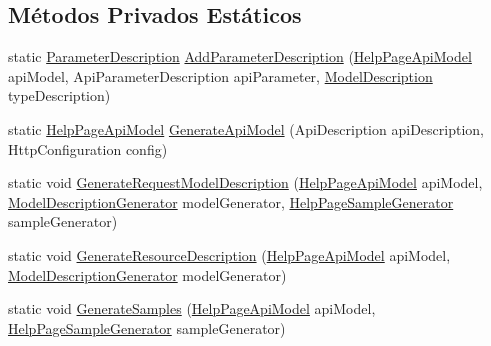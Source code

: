 \subsection*{Métodos Privados Estáticos}
\begin{DoxyCompactItemize}
\item 
static \hyperlink{classApi3Layers_1_1Areas_1_1HelpPage_1_1ModelDescriptions_1_1ParameterDescription}{Parameter\+Description} \hyperlink{classApi3Layers_1_1Areas_1_1HelpPage_1_1HelpPageConfigurationExtensions_ab6eed27114a1a255723fa4ab8a65586d}{Add\+Parameter\+Description} (\hyperlink{classApi3Layers_1_1Areas_1_1HelpPage_1_1Models_1_1HelpPageApiModel}{Help\+Page\+Api\+Model} api\+Model, Api\+Parameter\+Description api\+Parameter, \hyperlink{classApi3Layers_1_1Areas_1_1HelpPage_1_1ModelDescriptions_1_1ModelDescription}{Model\+Description} type\+Description)
\item 
static \hyperlink{classApi3Layers_1_1Areas_1_1HelpPage_1_1Models_1_1HelpPageApiModel}{Help\+Page\+Api\+Model} \hyperlink{classApi3Layers_1_1Areas_1_1HelpPage_1_1HelpPageConfigurationExtensions_a3008459bcff41d3002541c3ff407e712}{Generate\+Api\+Model} (Api\+Description api\+Description, Http\+Configuration config)
\item 
static void \hyperlink{classApi3Layers_1_1Areas_1_1HelpPage_1_1HelpPageConfigurationExtensions_af01d383426748f527ebe3c07e9f8a4bc}{Generate\+Request\+Model\+Description} (\hyperlink{classApi3Layers_1_1Areas_1_1HelpPage_1_1Models_1_1HelpPageApiModel}{Help\+Page\+Api\+Model} api\+Model, \hyperlink{classApi3Layers_1_1Areas_1_1HelpPage_1_1ModelDescriptions_1_1ModelDescriptionGenerator}{Model\+Description\+Generator} model\+Generator, \hyperlink{classApi3Layers_1_1Areas_1_1HelpPage_1_1HelpPageSampleGenerator}{Help\+Page\+Sample\+Generator} sample\+Generator)
\item 
static void \hyperlink{classApi3Layers_1_1Areas_1_1HelpPage_1_1HelpPageConfigurationExtensions_ad4296fc92e40d842eb654298d2ed3e7e}{Generate\+Resource\+Description} (\hyperlink{classApi3Layers_1_1Areas_1_1HelpPage_1_1Models_1_1HelpPageApiModel}{Help\+Page\+Api\+Model} api\+Model, \hyperlink{classApi3Layers_1_1Areas_1_1HelpPage_1_1ModelDescriptions_1_1ModelDescriptionGenerator}{Model\+Description\+Generator} model\+Generator)
\item 
static void \hyperlink{classApi3Layers_1_1Areas_1_1HelpPage_1_1HelpPageConfigurationExtensions_ad2943e71c3adf193fbfdc68e06d35898}{Generate\+Samples} (\hyperlink{classApi3Layers_1_1Areas_1_1HelpPage_1_1Models_1_1HelpPageApiModel}{Help\+Page\+Api\+Model} api\+Model, \hyperlink{classApi3Layers_1_1Areas_1_1HelpPage_1_1HelpPageSampleGenerator}{Help\+Page\+Sample\+Generator} sample\+Generator)

\end{DoxyCompactItemize}
